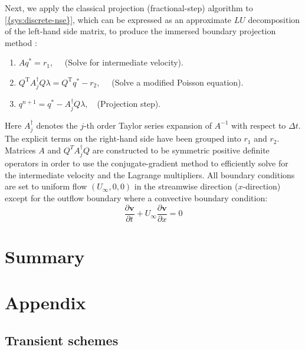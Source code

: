 \documentclass{article}
\numberwithin{equation}{section}
\begin{document}
Next, we apply the classical projection (fractional-step) algorithm to \cref{{sys:discrete-nse}}, which can be expressed as an approximate $LU$ decomposition of the left-hand side matrix, to produce the immersed boundary projection method \cite{Colonius:2008}:
\begin{enumerate}
	\item $A q^*=r_1, \quad$ (Solve for intermediate velocity).
	\item $Q^{\mathrm{T}} A_j^{\dagger} Q \lambda=Q^{\mathrm{T}} q^*-r_2, \quad$ (Solve a modified Poisson equation).
	\item $q^{n+1}=q^*-A_j^{\dagger} Q \lambda, \quad$(Projection step).
\end{enumerate}
Here $A^{\dagger}_{j}$ denotes the $j$-th order Taylor series expansion of $A^{-1}$ with respect to $\Delta t$. The explicit terms on the right-hand side have been grouped into $r_1$ and $r_2$. Matrices $A$ and $Q^TA^\dagger_jQ$ are constructed to be symmetric positive definite operators in order to use the conjugate-gradient method to efficiently solve for the intermediate velocity and the Lagrange multipliers. All boundary conditions are set to uniform flow $(U_{\infty}, 0, 0)$ in the streamwise direction ($x$-direction) except for the outflow boundary where a convective boundary condition:
\begin{equation}
  \frac{\partial\boldsymbol{v}}{\partial t} + U_\infty \frac{\partial \boldsymbol{v}}{\partial x}=0
\end{equation}




	
\section{Summary}\label{sec:summary}
	

\pagebreak


 

\pagebreak
\appendix
\section{Appendix}

\subsection{Transient schemes}
\end{document}
